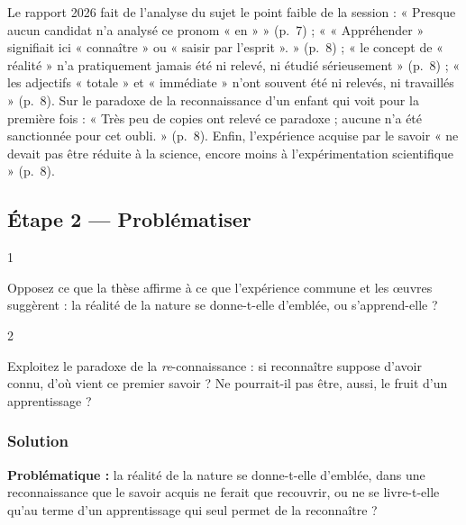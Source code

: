 \documentclass[11pt,a4paper]{article}
\begin{document}
\begin{jury}

Le rapport 2026 fait de l'analyse du sujet le point faible de la session : « Presque aucun candidat n'a analysé ce pronom « en » » (p.~7) ; « « Appréhender » signifiait ici « connaître » ou « saisir par l'esprit ». » (p.~8) ; « le concept de « réalité » n'a pratiquement jamais été ni relevé, ni étudié sérieusement » (p.~8) ; « les adjectifs « totale » et « immédiate » n'ont souvent été ni relevés, ni travaillés » (p.~8). Sur le paradoxe de la reconnaissance d'un enfant qui voit pour la première fois : « Très peu de copies ont relevé ce paradoxe ; aucune n'a été sanctionnée pour cet oubli. » (p.~8). Enfin, l'expérience acquise par le savoir « ne devait pas être réduite à la science, encore moins à l'expérimentation scientifique » (p.~8).

\end{jury}

\hypertarget{uxe9tape-2-probluxe9matiser}{%
\subsection{Étape 2 --- Problématiser}\label{uxe9tape-2-probluxe9matiser}}

\begin{indication}{1}

Opposez ce que la thèse affirme à ce que l'expérience commune et les œuvres suggèrent : la réalité de la nature se donne-t-elle d'emblée, ou s'apprend-elle ?

\end{indication}

\begin{indication}{2}

Exploitez le paradoxe de la \emph{re}-connaissance : si reconnaître suppose d'avoir connu, d'où vient ce premier savoir ? Ne pourrait-il pas être, aussi, le fruit d'un apprentissage ?

\end{indication}

\hypertarget{solution-4}{%
\subsubsection{Solution}\label{solution-4}}

\textbf{Problématique :} la réalité de la nature se donne-t-elle d'emblée, dans une reconnaissance que le savoir acquis ne ferait que recouvrir, ou ne se livre-t-elle qu'au terme d'un apprentissage qui seul permet de la reconnaître ?
\end{document}
